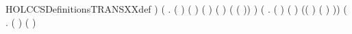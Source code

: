 \begin{SaveVerbatim}{HOLCCSDefinitionsTRANSXXdef}
                        ) \HOLSymConst{\HOLTokenDisj{}}
                (\HOLSymConst{\HOLTokenExists{}}    .
                     ( \HOLSymConst{=}  \HOLSymConst{\ensuremath{\parallel}} ) \HOLSymConst{\HOLTokenConj{}} ( \HOLSymConst{=} \HOLConst{\ensuremath{\tau}}) \HOLSymConst{\HOLTokenConj{}} ( \HOLSymConst{=}  \HOLSymConst{\ensuremath{\parallel}} ) \HOLSymConst{\HOLTokenConj{}}
                       ( )  \HOLSymConst{\HOLTokenConj{}}
                       ( ( )) ) \HOLSymConst{\HOLTokenDisj{}}
                (\HOLSymConst{\HOLTokenExists{}}   .
                     ( \HOLSymConst{=} \HOLConst{\ensuremath{\nu}}  ) \HOLSymConst{\HOLTokenConj{}} ( \HOLSymConst{=} \HOLConst{\ensuremath{\nu}}  ) \HOLSymConst{\HOLTokenConj{}}
                         \HOLSymConst{\HOLTokenConj{}}
                     (( \HOLSymConst{=} \HOLConst{\ensuremath{\tau}}) \HOLSymConst{\HOLTokenDisj{}}
                      ( \HOLSymConst{=}  ) \HOLSymConst{\HOLTokenConj{}}  \HOLConst{\HOLTokenNotIn{}}  \HOLSymConst{\HOLTokenConj{}}   \HOLConst{\HOLTokenNotIn{}} )) \HOLSymConst{\HOLTokenDisj{}}
                (\HOLSymConst{\HOLTokenExists{}}   .
                     ( \HOLSymConst{=}   ) \HOLSymConst{\HOLTokenConj{}} ( \HOLSymConst{=}   ) \HOLSymConst{\HOLTokenConj{}}

\end{SaveVerbatim}

